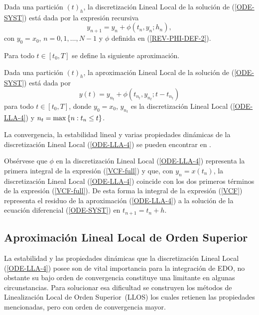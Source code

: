\begin{definition}
	\label{definition LLD} Dada una partición $(t)_{h}$, la discretización Lineal Local de la solución de (\ref{ODE-SYST}) está dada por la expresión recursiva
	\begin{equation}
	y_{n+1}=y_{n}+\phi \left( t_{n},y_{n};h_{n}\right) ,  \label{ODE-LLA-4}
	\end{equation}%
	con $y_{0}=x_{0}$, $n=0,1,\ldots,N-1$ y $\phi$ definida en (\ref{REV-PHI-DEF-2}).
\end{definition}

Para todo $t\in[t_{0},T]$ se define la siguiente aproximación.
\begin{definition}
	\label{definition LLA} Dada una partición $(t)_{h}$, la aproximación
	Lineal Local de la solución de (\ref{ODE-SYST}) está dada por 
	\begin{equation}
	y(t)=y_{n_{t}}+\phi(t_{n_{t}},y_{n_{t}};t-t_{n_{t}})
	\label{ODE-REV-FORM-LLA}
	\end{equation}
	para todo $t\in[t_{0},T]$, donde $y_{0}=x_{0}$, $y_{n_{t}}$ es la discretización Lineal Local (\ref{ODE-LLA-4}) y ${n_{t}=\max\left\{ n:t_{n}\leq t \right\}}$.
\end{definition}

 La convergencia, la estabilidad lineal y varias propiedades dinámicas de  la discretización Lineal Local (\ref{ODE-LLA-4}) se pueden encontrar en \cite{Jimenez02AMC}. 
 
 Obsérvese que $\phi$ en la discretización Lineal Local (\ref{ODE-LLA-4}) representa la primera integral de la expresión (\ref{VCF-full}) y que, con $y_n=x(t_n)$, la discretización Lineal Local (\ref{ODE-LLA-4}) coincide con los dos primeros términos de la expresión (\ref{VCF-full}). De esta forma la integral de la expresión (\ref{VCF}) representa el residuo de la aproximación (\ref{ODE-LLA-4}) a la solución de la ecuación diferencial (\ref{ODE-SYST}) en $t_{n+1}=t_n+h$.
\subsection{Aproximación Lineal Local de Orden Superior}

La estabilidad y las propiedades dinámicas que la discretización Lineal Local (\ref{ODE-LLA-4}) posee son de vital importancia para la integración de EDO, no obstante su bajo orden de convergencia constituye una limitante en algunas circunstancias. Para solucionar esa dificultad se construyen los métodos de Linealización Local de Orden Superior~(LLOS) los cuales retienen las propiedades mencionadas, pero con orden de convergencia mayor. 

